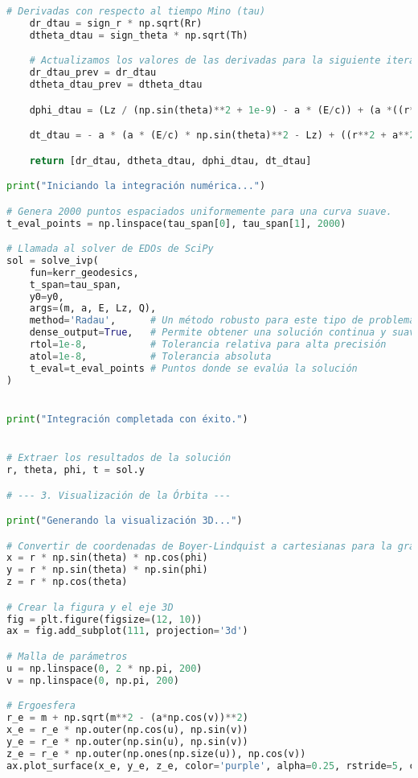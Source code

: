 \begin{lstlisting}[language=Python, caption=Programa para el calculo de las geodesicas en Kerr]
    # Derivadas con respecto al tiempo Mino (tau)
    dr_dtau = sign_r * np.sqrt(Rr)
    dtheta_dtau = sign_theta * np.sqrt(Th)

    # Actualizamos los valores de las derivadas para la siguiente iteración
    dr_dtau_prev = dr_dtau
    dtheta_dtau_prev = dtheta_dtau

    dphi_dtau = (Lz / (np.sin(theta)**2 + 1e-9) - a * (E/c)) + (a *((r**2 + a**2) * (E/c) - a * Lz) / Delta)

    dt_dtau = - a * (a * (E/c) * np.sin(theta)**2 - Lz) + ((r**2 + a**2) * ((r**2 + a**2) * (E/c) - a * Lz) / Delta)

    return [dr_dtau, dtheta_dtau, dphi_dtau, dt_dtau]

print("Iniciando la integración numérica...")

# Genera 2000 puntos espaciados uniformemente para una curva suave.
t_eval_points = np.linspace(tau_span[0], tau_span[1], 2000) 

# Llamada al solver de EDOs de SciPy
sol = solve_ivp(
    fun=kerr_geodesics,
    t_span=tau_span,
    y0=y0,
    args=(m, a, E, Lz, Q),
    method='Radau',      # Un método robusto para este tipo de problemas
    dense_output=True,   # Permite obtener una solución continua y suave
    rtol=1e-8,           # Tolerancia relativa para alta precisión
    atol=1e-8,           # Tolerancia absoluta
    t_eval=t_eval_points # Puntos donde se evalúa la solución
)


print("Integración completada con éxito.")


# Extraer los resultados de la solución
r, theta, phi, t = sol.y

# --- 3. Visualización de la Órbita ---

print("Generando la visualización 3D...")

# Convertir de coordenadas de Boyer-Lindquist a cartesianas para la gráfica
x = r * np.sin(theta) * np.cos(phi)
y = r * np.sin(theta) * np.sin(phi)
z = r * np.cos(theta)

# Crear la figura y el eje 3D
fig = plt.figure(figsize=(12, 10))
ax = fig.add_subplot(111, projection='3d')

# Malla de parámetros
u = np.linspace(0, 2 * np.pi, 200)
v = np.linspace(0, np.pi, 200)

# Ergoesfera
r_e = m + np.sqrt(m**2 - (a*np.cos(v))**2)
x_e = r_e * np.outer(np.cos(u), np.sin(v))
y_e = r_e * np.outer(np.sin(u), np.sin(v))
z_e = r_e * np.outer(np.ones(np.size(u)), np.cos(v))
ax.plot_surface(x_e, y_e, z_e, color='purple', alpha=0.25, rstride=5, cstride=5)


\end{lstlisting}
